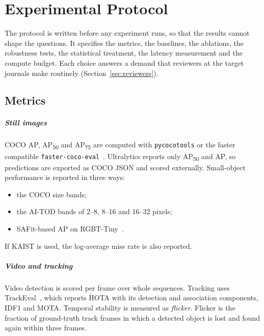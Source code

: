 \chapter{Experimental Protocol}
\label{ch:protocol}

The protocol is written before any experiment runs, so that the results
cannot shape the questions. It specifies the metrics, the baselines, the
ablations, the robustness tests, the statistical treatment, the latency
measurement and the compute budget. Each choice answers a demand that
reviewers at the target journals make routinely (Section~\ref{sec:reviewers}).

\section{Metrics}
\label{sec:metrics}

\paragraph{Still images}
COCO AP, AP\textsubscript{50} and AP\textsubscript{75} are computed with
\texttt{pycocotools} or the faster compatible
\texttt{faster-coco-eval}~\citep{lin2014coco,fastercocoeval_repo}. Ultralytics
reports only AP\textsubscript{50} and AP, so predictions are exported as COCO
JSON and scored externally. Small-object performance is reported in three
ways:
\begin{itemize}
  \item the COCO size bands;
  \item the AI-TOD bands of 2--8, 8--16 and 16--32 pixels;
  \item SAFit-based AP on RGBT-Tiny~\citep{ying2025rgbttiny}.
\end{itemize}
If KAIST is used, the log-average miss rate is also reported.

\paragraph{Video and tracking}
Video detection is scored per frame over whole sequences. Tracking uses
TrackEval~\citep{luiten2021hota,trackeval_repo}, which reports HOTA with its
detection and association components, IDF1 and MOTA. Temporal stability is
measured as \emph{flicker}. Flicker is the fraction of ground-truth track
frames in which a detected object is lost and found again within three
frames.

